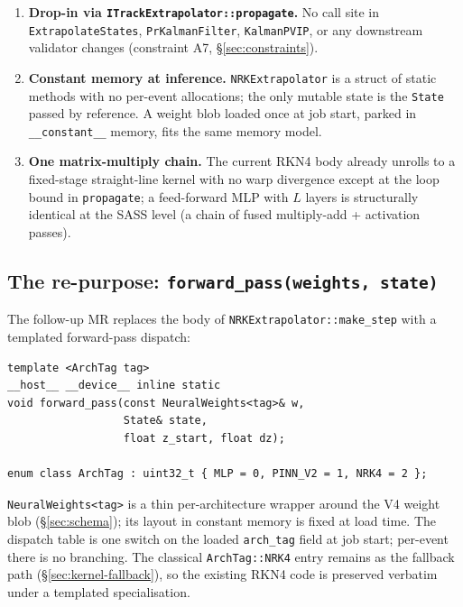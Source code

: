 \documentclass[11pt,a4paper]{article}
\newcommand{\code}[1]{\texttt{#1}}
\begin{document}
\begin{enumerate}[leftmargin=2em,nosep]
\item \textbf{Drop-in via \code{ITrackExtrapolator::propagate}.} No call site
  in \code{ExtrapolateStates}, \code{PrKalmanFilter}, \code{KalmanPVIP}, or
  any downstream validator changes (constraint A7,
  \S\ref{sec:constraints}).
\item \textbf{Constant memory at inference.} \code{NRKExtrapolator} is a struct
  of static methods with no per-event allocations; the only mutable state is
  the \code{State} passed by reference. A weight blob loaded once at job
  start, parked in \code{\_\_constant\_\_} memory, fits the same memory
  model.
\item \textbf{One matrix-multiply chain.} The current RKN4 body already
  unrolls to a fixed-stage straight-line kernel with no warp divergence
  except at the loop bound in \code{propagate}; a feed-forward MLP with
  $L$ layers is structurally identical at the SASS level (a chain of
  fused multiply-add + activation passes).
\end{enumerate}

\subsection{The re-purpose: \code{forward\_pass(weights, state)}}
\label{sec:repurpose}

The follow-up MR replaces the body of \code{NRKExtrapolator::make\_step} with
a templated forward-pass dispatch:

\begin{verbatim}
template <ArchTag tag>
__host__ __device__ inline static
void forward_pass(const NeuralWeights<tag>& w,
                  State& state,
                  float z_start, float dz);

enum class ArchTag : uint32_t { MLP = 0, PINN_V2 = 1, NRK4 = 2 };
\end{verbatim}

\code{NeuralWeights<tag>} is a thin per-architecture wrapper around the V4
weight blob (\S\ref{sec:schema}); its layout in constant memory is fixed at
load time. The dispatch table is one switch on the loaded \code{arch\_tag}
field at job start; per-event there is no branching. The classical
\code{ArchTag::NRK4} entry remains as the fallback path
(\S\ref{sec:kernel-fallback}), so the existing RKN4 code is preserved
verbatim under a templated specialisation.

\end{document}

